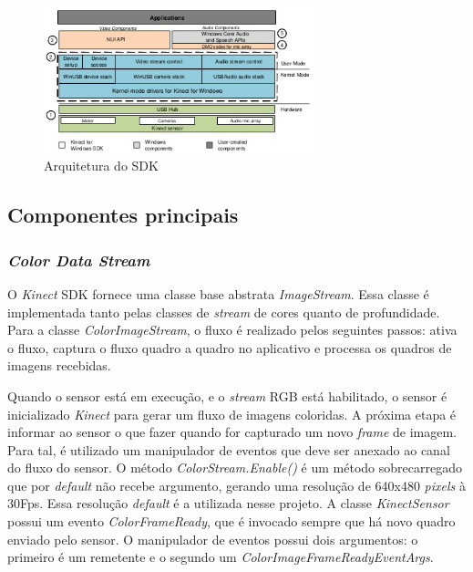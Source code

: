 \begin{figure}[ht]
\centering
\includegraphics[width=0.7\textwidth]{images/sdk_architecture_color.png}
\caption{Arquitetura do SDK}
\label{fig:sdk_architecture_color}
\end{figure}

\subsection{Componentes principais}\label{sec:componentes}

\subsubsection{\textit{Color Data Stream}}\label{sec:colorDataStream}
O \textit{Kinect} SDK fornece uma classe base abstrata \textit{ImageStream}. Essa classe é implementada tanto pelas classes de \textit{stream} de cores quanto de profundidade. Para a classe \textit{ColorImageStream}, o fluxo é realizado pelos seguintes passos: ativa o fluxo, captura o fluxo quadro a quadro no aplicativo e processa os quadros de imagens recebidas.

Quando o sensor está em execução, e o \textit{stream} RGB está habilitado, o sensor é inicializado  \textit{Kinect} para gerar um fluxo de imagens coloridas. A próxima etapa é informar ao sensor o que fazer quando for capturado um novo \textit{frame} de imagem. Para tal, é utilizado um manipulador de eventos que deve ser anexado ao canal do fluxo do sensor. O método \textit{ColorStream.Enable()} é um método sobrecarregado que por \textit{default} não recebe argumento, gerando uma resolução de  640x480 \textit{pixels} à 30Fps. Essa resolução \textit{default} é a utilizada nesse projeto. A classe \textit{KinectSensor} possui um evento \textit{ColorFrameReady}, que é invocado sempre que há novo quadro enviado pelo sensor. O manipulador de eventos possui dois argumentos: o primeiro é um remetente e o segundo um \textit{ColorImageFrameReadyEventArgs}.

